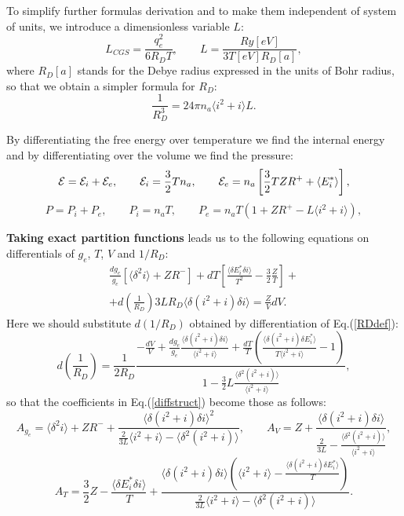 To simplify further formulas derivation and to make them independent of system of units,
we introduce a dimensionless variable $L$:
\begin{equation}
L_{CGS} = \frac{q_e^2}{6 R_D T},\qquad
L = \frac{Ry[eV]}{3 T[eV] R_D[a]},
\end{equation}
where $R_D[a]$ stands for the Debye radius expressed in the units of Bohr radius,
so that we obtain a simpler formula for $R_D$:
\begin{equation}
\frac{1}{R_D^3} = 24 \pi n_a \langle i^2+i \rangle L.
\end{equation}

By differentiating the free energy over temperature we find the internal energy and by differentiating over the volume we find the pressure:
\begin{equation}\label{EDH}
{\cal E}={\cal E}_i + {\cal E}_e, \qquad
{\cal E}_i = \frac32 Tn_a, \qquad
{\cal E}_e = n_a \left[ \frac32 TZR^+ + \langle E^*_i\rangle \right],
\end{equation}
\begin{equation}\label{PDH}
P = P_i+P_e, \qquad
P_i = n_a T, \qquad
P_e = n_a T (1 + ZR^+ - L \langle i^2+i \rangle),
\end{equation}

{\bf Taking exact partition functions} leads us to the following equations on differentials of $g_e$, $T$, $V$ and $1/R_D$:
\begin{eqnarray}
\frac{dg_e}{g_e} \left[ \langle \delta^2 i \rangle + ZR^- \right] +
dT \left[ \frac{\langle \delta E^*_i \delta i \rangle}{T^2} - \frac32 \frac{Z}T \right] + \\
\nonumber + d\left( \frac{1}{R_D} \right) 3L R_D \langle \delta(i^2+i) \delta i \rangle = \frac{Z}V dV.
\end{eqnarray}
Here we should substitute $d(1/R_D)$ obtained by differentiation of Eq.(\ref{RDdef}):
\begin{equation}
d \left( \frac1{R_D} \right) = \frac{1}{2 R_D} \frac{-\frac{dV}{V} +
\frac{dg_e}{g_e} \frac{\langle \delta(i^2+i) \delta i \rangle}{\langle i^2+i \rangle} +
\frac{dT}{T} \left( \frac{\langle \delta(i^2+i) \delta E^*_i \rangle}{T \langle i^2+i \rangle} - 1 \right) }
{1 - \frac32L \frac{\langle \delta^2 (i^2+i) \rangle}{\langle i^2+i \rangle}},
\end{equation}
so that the coefficients in Eq.(\ref{diffstruct}) become those as follows:
\begin{equation}
A_{g_e} = \langle \delta^2 i \rangle + ZR^- + \frac{\langle \delta(i^2+i) \delta i \rangle^2}
{\frac{2}{3L} \langle i^2+i \rangle - \langle \delta^2 (i^2+i) \rangle}, \qquad
A_V = Z + \frac{\langle \delta(i^2+i) \delta i \rangle}
{\frac{2}{3L} - \frac{\langle \delta^2(i^2+i) \rangle}{\langle i^2+i \rangle}},
\end{equation}
\begin{equation}\nonumber
A_T = \frac32 Z - \frac{\langle \delta E^*_i \delta i \rangle}{T} +
\frac
{\langle \delta(i^2+i) \delta i \rangle \left( \langle i^2+i \rangle - \frac{\langle \delta(i^2+i) \delta E^*_i \rangle}{T} \right) }
{\frac{2}{3L} \langle i^2+i \rangle - \langle \delta^2(i^2+i) \rangle}.
\end{equation}


